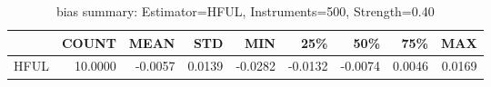 \begin{table}[ht]
\centering
\caption{bias summary: Estimator=HFUL, Instruments=500, Strength=0.40}
\begin{tabular}{lrrrrrrrr}
\toprule
 & COUNT & MEAN & STD & MIN & 25\% & 50\% & 75\% & MAX \\
\midrule
HFUL & 10.0000 & -0.0057 & 0.0139 & -0.0282 & -0.0132 & -0.0074 & 0.0046 & 0.0169 \\
\bottomrule
\end{tabular}
\end{table}
